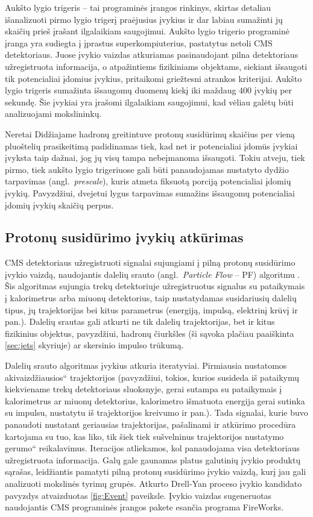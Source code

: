 \documentclass[a4paper, 12pt, oneside]{article}
\newcommand{\ltq}[1]{{\quotedblbase{}#1\textquotedblleft{}}}
\newlength\q
\begin{document}
Aukšto lygio trigeris -- tai programinės įrangos rinkinys, skirtas detaliau išanalizuoti pirmo lygio trigerį praėjusius
įvykius ir dar labiau sumažinti jų skaičių prieš įrašant ilgalaikiam saugojimui.
Aukšto lygio trigerio programinė įranga yra sudiegta į įprastus superkompiuterius, pastatytus netoli CMS detektoriaus.
Juose įvykio vaizdas atkuriamas pasinaudojant pilna detektoriaus užregistruota informacija, o atpažintiems fizikiniams
objektams, siekiant išsaugoti tik potencialiai įdomius įvykius, pritaikomi griežtesni atrankos kriterijai.
Aukšto lygio trigeris sumažinta išsaugomų duomenų kiekį iki maždaug $400$ įvykių per sekundę.
Šie įvykiai yra įrašomi ilgalaikiam saugojimui, kad vėliau galėtų būti analizuojami mokslininkų.

Neretai Didžiajame hadronų greitintuve protonų susidūrimų skaičius per vieną pluoštelių prasikeitimą padidinamas tiek,
kad net ir potencialiai įdomūs įvykiai įvyksta taip dažnai, jog jų visų tampa nebeįmanoma išsaugoti.
Tokiu atveju, tiek pirmo, tiek aukšto lygio trigeriuose gali būti panaudojamas nustatyto dydžio tarpavimas (angl.\ \textit{prescale}),
kuris atmeta fiksuotą porciją potencialiai įdomių įvykių.
Pavyzdžiui, dvejetui lygus tarpavimas sumažins išsaugomų potencialiai įdomių įvykių skaičių perpus.


\subsection{Protonų susidūrimo įvykių atkūrimas}
CMS detektoriaus užregistruoti signalai sujungiami į pilną protonų susidūrimo įvykio vaizdą, naudojantis
dalelių srauto (angl.\ \textit{Particle Flow} -- PF) algoritmu \cite{ParticleFlow}.
Šis algoritmas sujungia trekų detektoriuje užregistruotus signalus su pataikymais į kalorimetrus arba miuonų
detektorius, taip nustatydamas susidariusių dalelių tipus, jų trajektorijas bei kitus parametrus
(energiją, impulsą, elektrinį krūvį ir pan.).
Dalelių srautas gali atkurti ne tik dalelių trajektorijas, bet ir kitus fizikinius objektus, pavyzdžiui,
hadronų čiurkšles (ši sąvoka plačiau paaiškinta \ref{sec:jets} skyriuje) ar skersinio impulso trūkumą.

Dalelių srauto algoritmas įvykius atkuria iteratyviai.
Pirmiausia nustatomos \ltq{akivaizdžiausios} trajektorijos (pavyzdžiui, tokios, kurios susideda iš pataikymų
kiekviename trekų detektoriaus sluoksnyje, gerai sutampa su pataikymais į kalorimetrus ar miuonų detektorius,
kalorimetro išmatuota energija gerai sutinka su impulsu, nustatytu iš trajektorijos kreivumo ir pan.).
Tada signalai, kurie buvo panaudoti nustatant geriausias trajektorijas, pašalinami ir atkūrimo procedūra
kartojama su tuo, kas liko, tik šiek tiek sušvelninus trajektorijos nustatymo \ltq{gerumo} reikalavimus.
Iteracijos atliekamos, kol panaudojama visa detektoriaus užregistruota informacija.
Galų gale gaunamas platus galutinių įvykio produktų sąrašas, leidžiantis pamatyti pilną protonų susidūrimo įvykio vaizdą,
kurį jau gali analizuoti mokslinės tyrimų grupės.
Atkurto Drell-Yan proceso įvykio kandidato pavyzdys atvaizduotas \ref{fig:Event} paveiksle.
Įvykio vaizdas sugeneruotas naudojantis CMS programinės įrangos pakete esančia programa FireWorks.
\end{document}
